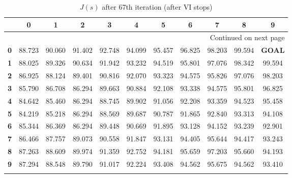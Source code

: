 \documentclass{article}
\begin{document}
\begin{longtable}{|c|c|c|c|c|c|c|c|c|c|c|}
\toprule
{} &       0 &       1 &       2 &       3 &       4 &       5 &       6 &       7 &       8 &       9 \\
\midrule
\endhead
\midrule
\multicolumn{11}{r}{{Continued on next page}} \\
\midrule
\endfoot

\bottomrule
\endlastfoot
\textbf{0} &  88.723 &  90.060 &  91.402 &  92.748 &  94.099 &  95.457 &  96.825 &  98.203 &  99.594 &  \textbf{GOAL} \\\hline
\textbf{1} &  88.025 &  89.326 &  90.634 &  91.942 &  93.232 &  94.519 &  95.801 &  97.076 &  98.342 &  99.594 \\\hline
\textbf{2} &  86.925 &  88.124 &  89.401 &  90.816 &  92.070 &  93.323 &  94.575 &  95.826 &  97.076 &  98.203 \\\hline
\textbf{3} &  85.790 &  86.708 &  86.294 &  89.663 &  90.884 &  92.108 &  93.338 &  94.575 &  95.801 &  96.825 \\\hline
\textbf{4} &  84.642 &  85.460 &  86.294 &  88.745 &  89.902 &  91.056 &  92.208 &  93.359 &  94.523 &  95.458 \\\hline
\textbf{5} &  84.219 &  85.218 &  86.294 &  88.569 &  89.687 &  90.787 &  91.865 &  92.840 &  93.313 &  94.108 \\\hline
\textbf{6} &  85.344 &  86.369 &  86.294 &  89.448 &  90.669 &  91.895 &  93.128 &  94.152 &  93.239 &  92.901 \\\hline
\textbf{7} &  86.466 &  87.757 &  89.073 &  90.558 &  91.847 &  93.131 &  94.405 &  95.644 &  94.417 &  93.243 \\\hline
\textbf{8} &  87.263 &  88.609 &  89.974 &  91.359 &  92.752 &  94.181 &  95.659 &  97.203 &  95.660 &  94.193 \\\hline
\textbf{9} &  87.294 &  88.548 &  89.790 &  91.017 &  92.224 &  93.408 &  94.562 &  95.675 &  94.562 &  93.410 \\\hline
\caption{$J(s)$ after 67th iteration (after VI stops)}
\end{longtable}
\end{document}
